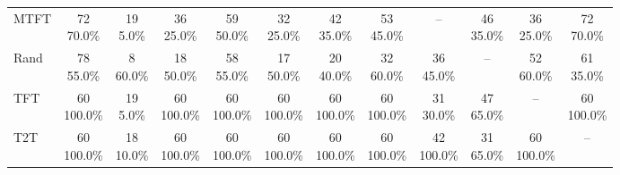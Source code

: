 \documentclass[11pt]{article}
\begin{document}
\begin{table}[H]
{\begin{tabular}{lccccccccccc}
MTFT & \shortstack{72\\70.0\%} & \shortstack{19\\5.0\%} & \shortstack{36\\25.0\%} & \shortstack{59\\50.0\%} & \shortstack{32\\25.0\%} & \shortstack{42\\35.0\%} & \shortstack{53\\45.0\%} & -- & \shortstack{46\\35.0\%} & \shortstack{36\\25.0\%} & \shortstack{72\\70.0\%} \\
Rand & \shortstack{78\\55.0\%} & \shortstack{8\\60.0\%} & \shortstack{18\\50.0\%} & \shortstack{58\\55.0\%} & \shortstack{17\\50.0\%} & \shortstack{20\\40.0\%} & \shortstack{32\\60.0\%} & \shortstack{36\\45.0\%} & -- & \shortstack{52\\60.0\%} & \shortstack{61\\35.0\%} \\
TFT & \shortstack{60\\100.0\%} & \shortstack{19\\5.0\%} & \shortstack{60\\100.0\%} & \shortstack{60\\100.0\%} & \shortstack{60\\100.0\%} & \shortstack{60\\100.0\%} & \shortstack{60\\100.0\%} & \shortstack{31\\30.0\%} & \shortstack{47\\65.0\%} & -- & \shortstack{60\\100.0\%} \\
T2T & \shortstack{60\\100.0\%} & \shortstack{18\\10.0\%} & \shortstack{60\\100.0\%} & \shortstack{60\\100.0\%} & \shortstack{60\\100.0\%} & \shortstack{60\\100.0\%} & \shortstack{60\\100.0\%} & \shortstack{42\\100.0\%} & \shortstack{31\\65.0\%} & \shortstack{60\\100.0\%} & -- \\
\bottomrule
\end{tabular}%
}
\endgroup


\end{table}
\end{document}
